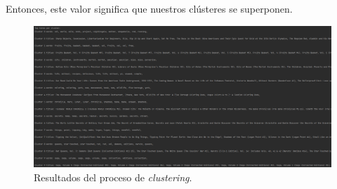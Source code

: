 \documentclass{uimppracticas}
\begin{document}
Entonces, este valor significa que nuestros clústeres se superponen. 

\begin{figure}[h]
	\centering
	\includegraphics[scale=0.35]{images/results}
	\caption{Resultados del proceso de \textit{clustering}.}
	\label{results}
\end{figure}

\renewcommand{\refname}{Bibliografía}


\end{document}
